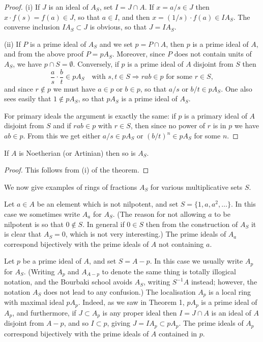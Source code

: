 \begin{proof}
(i) If $J$ is an ideal of $A_S$, set $I = J \cap A$. If $x = a/s \in J$ then
$x \cdot f(s) = f(a) \in J$, so that $a \in I$, and then $x = (1/s) \cdot f(a) \in IA_S$. The converse
inclusion $IA_S \subset J$ is obvious, so that $J = IA_S$.

(ii) If $P$ is a prime ideal of $A_S$ and we set $p = P \cap A$, then $p$ is a prime
ideal of $A$, and from the above proof $P = pA_S$. Moreover, since $P$ does
not contain units of $A_S$, we have $p \cap S = \emptyset$. Conversely, if $p$ is a prime
ideal of $A$ disjoint from $S$ then
\[
  \frac{a}{s} \cdot \frac{b}{t} \in pA_S \quad \text{with } s, t \in S \Rightarrow rab \in p \text{ for some } r \in S,
\]
and since $r \notin p$ we must have $a \in p$ or $b \in p$, so that $a/s$ or $b/t \in pA_S$. One
also sees easily that $1 \notin pA_S$, so that $pA_S$ is a prime ideal of $A_S$.

For primary ideals the argument is exactly the same: if $p$ is a primary
ideal of $A$ disjoint from $S$ and if $rab \in p$ with $r \in S$, then since no power
of $r$ is in $p$ we have $ab \in p$. From this we get either $a/s \in pA_S$ or $(b/t)^n \in pA_S$
for some $n$.
\end{proof}

\begin{corollary*}
If $A$ is Noetherian (or Artinian) then so is $A_S$.
\end{corollary*}

\begin{proof}
This follows from (i) of the theorem.
\end{proof}

We now give examples of rings of fractions $A_S$ for various multiplicative
sets $S$.

\begin{example}\label{ex:4.1}
Let $a \in A$ be an element which is not nilpotent, and set
$S = \{1, a, a^2, \ldots\}$. In this case we sometimes write $A_a$ for $A_S$. (The reason
for not allowing $a$ to be nilpotent is so that $0 \notin S$. In general if $0 \in S$ then
from the construction of $A_S$ it is clear that $A_S = 0$, which is not very
interesting.) The prime ideals of $A_a$ correspond bijectively with the prime
ideals of $A$ not containing $a$.
\end{example}

\begin{example}\label{ex:4.2}
Let $p$ be a prime ideal of $A$, and set $S = A - p$. In this case
we usually write $A_p$ for $A_S$. (Writing $A_p$ and $A_{A-p}$ to denote the same thing
is totally illogical notation, and the Bourbaki school avoids $A_S$, writing
$S^{-1}A$ instead; however, the notation $A_S$ does not lead to any confusion.)
The localisation $A_p$ is a local ring with maximal ideal $pA_p$. Indeed, as we saw
in Theorem 1, $pA_p$ is a prime ideal of $A_p$, and furthermore, if $J \subset A_p$ is any
proper ideal then $I = J \cap A$ is an ideal of $A$ disjoint from $A - p$, and so $I \subset p$,
giving $J = IA_p \subset pA_p$. The prime ideals of $A_p$ correspond bijectively with
the prime ideals of $A$ contained in $p$.
\end{example}

